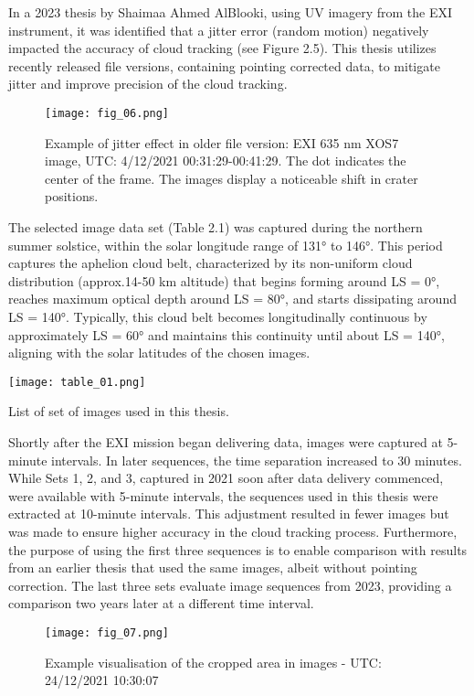 In a 2023 thesis by Shaimaa Ahmed AlBlooki, using UV imagery from the EXI instrument, it was identified that a jitter error (random motion) negatively impacted the accuracy of cloud tracking\cite{AlBlooki2023} (see Figure 2.5). This thesis utilizes recently released file versions, containing pointing corrected data, to mitigate jitter and improve precision of the cloud tracking.
\FloatBarrier
\begin{figure}[h!] 
    \centering
    \texttt{[image: fig\_06.png]}
    \caption{Example of jitter effect in older file version: EXI 635 nm XOS7 image, UTC: 4/12/2021 00:31:29-00:41:29\cite{AlBlooki2023}. The dot indicates the center of the frame. The images display a noticeable shift in crater positions.}
\end{figure}
\FloatBarrier
The selected image data set (Table 2.1) was captured during the northern summer solstice, within the solar longitude range of 131° to 146°. This period captures the aphelion cloud belt, characterized by its non-uniform cloud distribution (approx.14-50 km altitude) that begins forming around LS = 0°, reaches maximum optical depth around LS = 80°, and starts dissipating around LS = 140°. Typically, this cloud belt becomes longitudinally continuous by approximately LS = 60° and maintains this continuity until about LS = 140°, aligning with the solar latitudes of the chosen images\cite{clancyetalChapter052017}. 
\FloatBarrier
\begin{table}[h!]
    \centering
    \texttt{[image: table\_01.png]}
    \caption{List of set of images used in this thesis.}
\end{table}
\FloatBarrier
Shortly after the EXI mission began delivering data, images were captured at 5-minute intervals. In later sequences, the time separation increased to 30 minutes. While Sets 1, 2, and 3, captured in 2021 soon after data delivery commenced, were available with 5-minute intervals, the sequences used in this thesis were extracted at 10-minute intervals. This adjustment resulted in fewer images but was made to ensure higher accuracy in the cloud tracking process. Furthermore, the purpose of using the first three sequences is to enable comparison with results from an earlier thesis that used the same images, albeit without pointing correction\cite{AlBlooki2023}. The last three sets evaluate image sequences from 2023, providing a comparison two years later at a different time interval.
\FloatBarrier
\begin{figure}[h!] 
    \centering
    \texttt{[image: fig\_07.png]}
    \caption{Example visualisation of the cropped area in images - UTC: 24/12/2021 10:30:07}
\end{figure}
